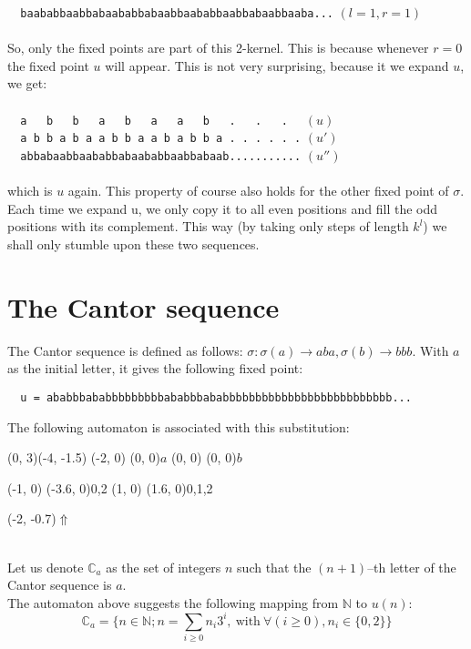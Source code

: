 \documentclass{article}
\begin{document}
\verb#  baababbaabbabaababbabaabbaababbaabbabaabbaaba...# $(l = 1, r = 1)$\\
\\
So, only the fixed points are part of this 2-kernel. This is because whenever
$r = 0$ the fixed point $u$ will appear.
This is not very surprising, because it we expand $u$, we get:\\
\\
\verb#  a   b   b   a   b   a   a   b   .   .   .  #  $(u)$\\
\verb#  a b b a b a a b b a a b a b b a . . . . . .#  $(u')$\\
\verb#  abbabaabbaababbabaababbaabbabaab...........#  $(u'')$\\
\\
which is $u$ again. This property of course also holds for the other fixed 
point of $\sigma$. Each time we expand u, we only copy it to all even positions
and fill the odd positions with its complement. This way (by taking only steps
of length $k^l$) we shall only stumble upon these two sequences.

\section*{The Cantor sequence}
The Cantor sequence is defined as follows: $\sigma: \sigma(a) \rightarrow aba, 
\sigma(b) \rightarrow bbb$. With $a$ as the initial letter, it gives the 
following fixed point:
\begin{verbatim}
  u = ababbbababbbbbbbbbababbbababbbbbbbbbbbbbbbbbbbbbbbbbb...
\end{verbatim}
The following automaton is associated with this 
substitution:\\
\begin{graph}(0, 3)(-4, -1.5)
  (-2, 0) (0, 0){$a$}
  (0, 0)  (0, 0){$b$}

  (-1, 0) \freetext(-3.6, 0){0,2}
   
  (1, 0) \freetext(1.6, 0){0,1,2}

  \freetext(-2, -0.7){$\Uparrow$}
\end{graph}\\
Let us denote $\mathbb{C}_a$ as the set of integers $n$ such that the 
$(n + 1)$--th letter of the Cantor sequence is $a$.\\
The automaton above suggests the following mapping from 
$\mathbb{N}$ to $u(n)$:
\begin{displaymath}
  \mathbb{C}_a = \Big\{n \in \mathbb{N}; n = \sum_{i \ge 0} n_i3^i, 
  \mathrm{\ with\ } \forall(i \ge 0), n_i \in \{0, 2\}\Big\}
\end{displaymath}
\end{document}
